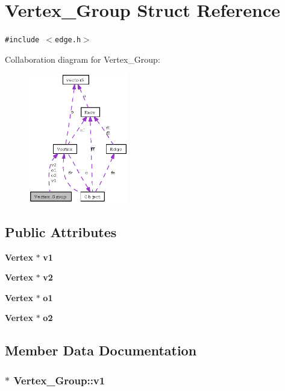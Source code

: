 \section{Vertex\_\-Group Struct Reference}
\label{structVertex__Group}
{\tt \#include $<$edge.h$>$}

Collaboration diagram for Vertex\_\-Group:\begin{figure}[H]
\begin{center}
\leavevmode
\includegraphics[width=123pt]{structVertex__Group__coll__graph}
\end{center}
\end{figure}
\subsection*{Public Attributes}
\begin{CompactItemize}
\item 
{\bf Vertex} $\ast$ {\bf v1}
\item 
{\bf Vertex} $\ast$ {\bf v2}
\item 
{\bf Vertex} $\ast$ {\bf o1}
\item 
{\bf Vertex} $\ast$ {\bf o2}
\end{CompactItemize}


\subsection{Member Data Documentation}
\subsubsection{$\ast$ {\bf Vertex\_\-Group::v1}}\label{structVertex__Group_4625d576ba33591be577f854966369f4}


